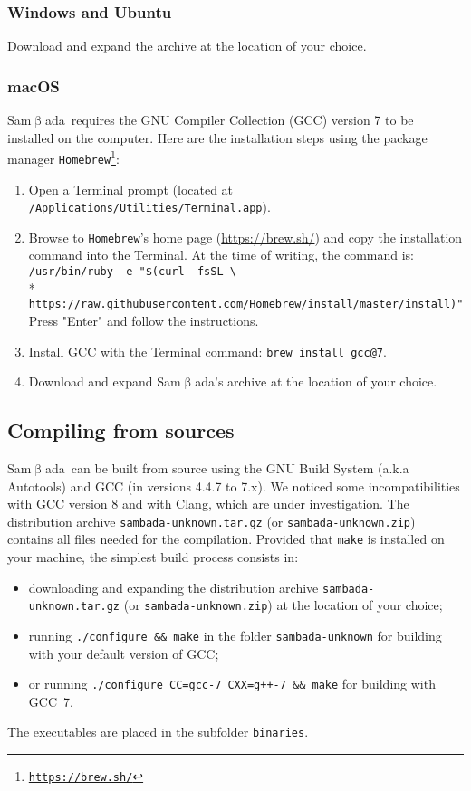 \documentclass[a4paper,11pt]{article}
\newcommand{\versionnumber}{unknown}
\newcommand{\smb}{\textsf{Sam$\upbeta$ada}}
\newcommand{\prog}[1]{\texttt{#1}}
\begin{document}
\subsubsection*{Windows and Ubuntu}
Download and expand the archive at the location of your choice.

\subsubsection*{macOS}
\smb\ requires the GNU Compiler Collection (GCC) version 7 to be installed on the computer.
Here are the installation steps using the package manager  \prog{Homebrew\footnote{\url{https://brew.sh/}}}:
\begin{enumerate}
\item{Open a Terminal prompt (located at \prog{/Applications/Utilities/Terminal.app}).}
\item{Browse to \prog{Homebrew}'s home page (\url{https://brew.sh/}) and copy the installation command into the Terminal.
At the time of writing, the command is: \\
\verb+/usr/bin/ruby -e "$(curl -fsSL \+ \\*
\verb+https://raw.githubusercontent.com/Homebrew/install/master/install)"+
Press "Enter" and follow the instructions.}
\item{Install GCC with the Terminal command: \prog{brew install gcc@7}.}
\item{Download and expand \smb's archive at the location of your choice.}
\end{enumerate}

\subsection*{Compiling from sources}
\smb\ can be built from source using the GNU Build System (a.k.a Autotools) and GCC (in versions 4.4.7 to 7.x).
We noticed some incompatibilities with GCC version 8 and with Clang, which are under investigation.
The distribution archive \prog{sambada-\versionnumber.tar.gz} (or \prog{sambada-\versionnumber.zip}) contains all files needed for the compilation. 
Provided that \prog{make} is installed on your machine, the simplest build process consists in:
\begin{itemize}
\item{downloading and expanding the distribution archive \prog{sambada-\versionnumber.tar.gz} (or \prog{sambada-\versionnumber.zip}) at the location of your choice;} 
\item{running \prog{./configure \&\& make} in the folder \prog{sambada-\versionnumber} for building with your default version of GCC;}
\item{or running \prog{./configure CC=gcc-7 CXX=g++-7 \&\& make} for building with GCC~7.}
\end{itemize}
The executables are placed in the subfolder \prog{binaries}.
\end{document}

